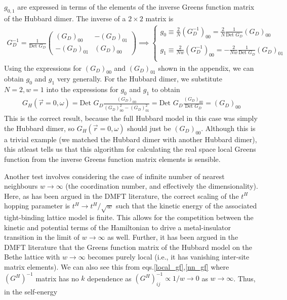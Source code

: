 \documentclass[12pt]{article}
\numberwithin{equation}{section}
\begin{document}
$g_{0,1}$ are expressed in terms of the elements of the inverse Greens function matrix of the Hubbard dimer. The inverse of a $2\times 2$ matrix is
\begin{equation}\begin{aligned}
	G_D^{-1} = \frac{1}{\text{Det }G_D}\begin{pmatrix} \left(G_D\right)_{00} &  -\left(G_D\right)_{01} \\ -\left(G_D\right)_{01} & \left(G_D\right)_{00}\end{pmatrix} \implies \begin{cases}
		g_0\equiv\frac{2}{N} (G^{-1}_{D})_{00} = \frac{2}{N} \frac{1}{\text{Det }G_D}\left(G_D\right)_{00} \\
		\\
		g_1\equiv\frac{2}{Nw} (G^{-1}_{D})_{00} = -\frac{2}{Nw}\frac{1}{\text{Det }G_D}\left(G_D\right)_{01} \\
	\end{cases}
\end{aligned}\end{equation}
Using the expressions for $(G_{D})_{00}$ and $(G_{D})_{01}$ shown in the appendix, we can obtain $g_{0}$ and $g_{1}$ very generally. For the Hubbard dimer, we substitute $N=2, w=1$ into the expressions for $g_{0}$ and $g_{1}$ to obtain
\begin{equation}\begin{aligned}
	G_H(\vec r = 0, \omega) = \text{Det }G_D\frac{\left(G_D\right)_{00}}{\left(G_D\right)_{00}^2 - \left(G_D\right)_{01}^2} = \text{Det }G_D\frac{\left(G_D\right)_{00}}{\text{Det }G_D} = \left(G_D\right)_{00}
\end{aligned}\end{equation}
This is the correct result, because the full Hubbard model in this case was simply the Hubbard dimer, so \(G_H(\vec r = 0, \omega)\) should just be \(\left(G_D\right)_{00}\). Although this is a trivial example (we matched the Hubbard dimer with another Hubbard dimer), this atleast tells us that this algorithm for calculating the real space local Greens function from the inverse Greens function matrix elements is sensible.
\par\noindent
Another test involves considering the case of infinite number of nearest neighbours $w\to\infty$ (the coordination number, and effectively the dimensionality). Here, as has been argued in the DMFT literature, the correct scaling of the $t^{H}$ hopping parameter is $t^{H}\to t^{H}/\sqrt{w}$ such that the kinetic energy of the associated tight-binding lattice model is finite. This allows for the competition between the kinetic and potential terms of the Hamiltonian to drive a metal-insulator transition in the limit of $w\to\infty$ as well. Further, it has been argued in the DMFT literature that the Greens function matrix of the Hubbard model on the Bethe lattice with $w\to\infty$ becomes purely local (i.e., it has vanishing inter-site matrix elements). We can also see this from eqs.\eqref{local_gf},\eqref{nn_gf} where $(G^{H})^{-1}$ matrix has no $k$ dependence as $(G^{H})^{-1}_{ij}\propto 1/w \to 0$ as $w\to\infty$. Thus, in the self-energy 
\end{document}
